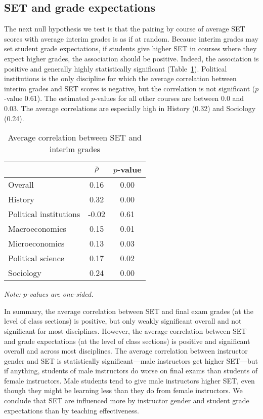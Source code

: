 \documentclass[12pt]{article}
\begin{document}
\subsection{SET and grade expectations}
The next null hypothesis we test is that the pairing by course of average SET scores with
average interim grades is as if at random.
Because interim grades may set student grade expectations,  if
students give higher SET in courses where they expect higher grades, the association
should be positive.
Indeed, the association is positive and generally highly statistically significant 
(Table~\ref{tab:instructor_gender}). 
Political institutions is the only discipline for which the average
correlation between interim grades and 
SET scores is negative, but the correlation is not significant ($p$-value 0.61). 
The estimated $p$-values for all other courses are between 0.0 and 0.03. 
The average correlations are especially high in History (0.32) and Sociology (0.24).

\begin{table}[htbp]
  \centering
  \footnotesize 
  \caption{Average correlation between SET and interim grades}
    \begin{tabular}{lcc}
    \toprule 
                          & $\bar{\rho}$  & $p$-value  \\
   \midrule
    Overall &                 0.16       & 0.00   \\
    History &                 0.32    & 0.00   \\
    Political institutions &  -0.02       & 0.61     \\
    Macroeconomics &     0.15          & 0.01    \\
    Microeconomics &      0.13         & 0.03     \\
    Political science &       0.17      & 0.02     \\
    Sociology &                0.24      & 0.00     \\
    \bottomrule
    \end{tabular}%
 \label{tab:instructor_gender}%
  
  \textit{Note: $p$-values are one-sided.}
\end{table}%
\normalsize

In summary, the average correlation between SET and final exam 
grades (at the level of class sections) is positive, 
but only weakly significant overall and not significant for most disciplines. 
However, the average correlation between SET and grade expectations 
(at the level of class sections) is positive and significant overall and across most disciplines.
The average correlation between instructor gender and SET is statistically significant---male instructors
get higher SET---but if anything, students of male instructors do worse on final exams
than students of female instructors.
Male students tend to give male instructors higher SET, even though they might be learning less
than they do from female instructors.
We conclude that SET are influenced more by instructor gender and student grade expectations than
by teaching effectiveness.
\end{document}
